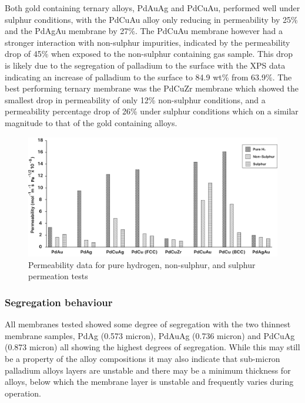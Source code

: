 Both gold containing ternary alloys, PdAuAg and PdCuAu, performed well under sulphur conditions, with the PdCuAu alloy only reducing in permeability by 25\% and the PdAgAu membrane by 27\%. The PdCuAu membrane however had a stronger interaction with non-sulphur impurities, indicated by the permeability drop of 45\% when exposed to the non-sulphur containing gas sample. This drop is likely due to the segregation of palladium to the surface with the XPS data indicating an increase of palladium to the surface to 84.9 wt\% from 63.9\%. The best performing ternary membrane was the PdCuZr membrane which showed the smallest drop in permeability of only 12\% non-sulphur conditions, and a permeability percentage drop of 26\% under sulphur conditions which on a similar magnitude to that of the gold containing alloys.
\begin{landscape}
    
\begin{figure}
    \includegraphics[width=\linewidth]{figures/permeabilitychart.png}
    \caption{Permeability data for pure hydrogen, non-sulphur, and sulphur permeation tests}
    \label{permgraph}
  \end{figure}
\end{landscape}

\subsubsection{Segregation behaviour}
All membranes tested showed some degree of segregation with the two thinnest membrane samples, PdAg (0.573 micron), PdAuAg (0.736  micron) and PdCuAg (0.873 micron) all showing the highest degrees of segregation. While this may still be a property of the alloy compositions it may also indicate that sub-micron palladium alloys layers are unstable and there may be a minimum thickness for alloys, below which the membrane layer is unstable and frequently varies during operation.

